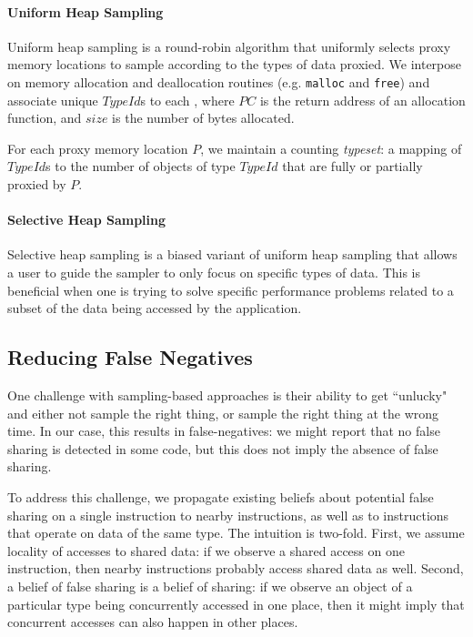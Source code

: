 \documentclass{sig-alternate}
\begin{document}
\newcommand\TypeId{$TypeId$}

\paragraph{Uniform Heap Sampling}
Uniform heap sampling is a round-robin algorithm that uniformly selects proxy memory locations to sample according to
the types of data proxied. We interpose on memory allocation and deallocation routines (e.g. \texttt{malloc} and \texttt{free})
and associate unique \TypeId{}s to each \TypeIdPair{}, where $PC$ is the return address of an allocation function, and $size$ is the
number of bytes allocated.

For each proxy memory location $P$, we maintain a counting \emph{typeset}: a mapping of \TypeId{}s to the number of objects of type
\TypeId{} that are fully or partially proxied by $P$.

\paragraph{Selective Heap Sampling}
Selective heap sampling is a biased variant of uniform heap sampling that allows a user to guide the sampler to only focus
on specific types of data. This is beneficial when one is trying to solve specific performance problems related to a subset
of the data being accessed by the application.

\subsection{Reducing False Negatives}\label{sec:falsenegs}

One challenge with sampling-based approaches is their ability to get ``unlucky" and either not sample
the right thing, or sample the right thing at the wrong time. In our case, this results in false-negatives:
we might report that no false sharing is detected in some code, but this does not imply the absence of
false sharing.

To address this challenge, we propagate existing beliefs about potential false sharing on a single instruction
to nearby instructions, as well as to instructions that operate on data of the same type. The intuition is
two-fold. First, we assume locality of accesses to shared data: if we observe a shared access on one instruction,
then nearby instructions probably access shared data as well. Second, a belief of false sharing is a belief of
sharing: if we observe an object of a particular type being concurrently accessed in one place, then it might
imply that concurrent accesses can also happen in other places.
\end{document}
